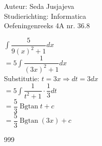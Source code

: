 \documentclass[a4paper]{article}
\newcommand{\integral}{\displaystyle\int}
\begin{document}
\noindent \large Auteur: Seda Jusjajeva\\
\noindent \large Studierichting: Informatica\\
\noindent \large Oefeningenreeks 4A nr. 36.8\\

\medskip

\normalsize

$\integral\dfrac{5}{9(x)^2 + 1}dx$ \\

$= 5\integral \dfrac{1}{(3x)^2 + 1}dx$ \\

Substitutie: $t = 3x \Rightarrow dt = 3dx$ \\

$= 5\integral\dfrac{1}{t^2 + 1}\cdot\dfrac{1}{3}dt$ \\

$= \dfrac{5}{3} \operatorname{Bgtan}{t} + c$ \\

$= \dfrac{5}{3} \operatorname{Bgtan}{(3x)} + c$ \\


\begin{thebibliography}{999}
\end{thebibliography}
\end{document}
